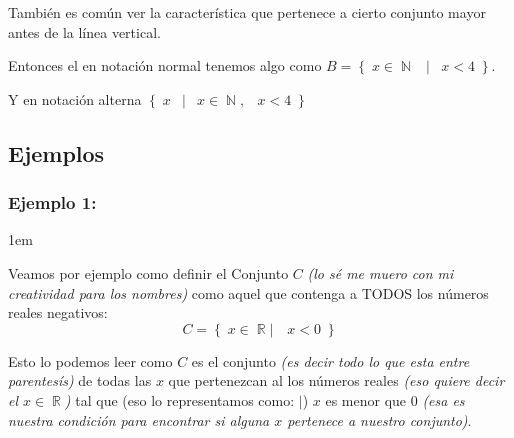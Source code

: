 \documentclass[12pt, fleqn]{report}                             %
\newenvironment{SmallIndentation}[1][0.75em]                    %
        {\begin{adjustwidth}{#1}{}\begin{footnotesize}}             %
        {\end{footnotesize}\end{adjustwidth}}                       %
\DeclareMathOperator \Space     {\quad}                         %
\DeclareMathOperator \MiniSpace {\;}                            %
\newcommand \Such           {\MiniSpace | \MiniSpace}           %
\theoremstyle{break}                                            %
\DeclareMathOperator \Naturals     {\mathbb{N}}                 %
\DeclareMathOperator \Reals        {\mathbb{R}}                 %
\newcommand{\Set}[1]            {\left\{ \; #1 \; \right\}}     %
\begin{document}
                    También es común ver la característica que pertenece a cierto conjunto mayor
                    antes de la línea vertical.

                    Entonces el en notación normal tenemos algo como 
                    $B = \Set{ x \in \Naturals \Such x < 4 }$.

                    Y en notación alterna  $\Set{ x \Such x \in \Naturals, \MiniSpace x < 4}$


                
            \clearpage
            \subsection{Ejemplos} 


                \subsubsection*{Ejemplo 1:}
                    \begin{SmallIndentation}[1em]

                        Veamos por ejemplo como definir el Conjunto $C$ \emph{(lo sé me muero con
                        mi creatividad para los nombres)} como aquel que contenga a TODOS los números
                        reales negativos:
                        \begin{equation*}   
                            C = \Set{ x \in \Reals |\quad x < 0}
                        \end{equation*}

                        Esto lo podemos leer como $C$ es el conjunto \emph{(es decir todo lo que esta
                        entre parentesís)} de todas las $x$ que pertenezcan al los números reales
                        \emph{(eso quiere decir el $x \in \Reals$)} tal que (eso lo representamos
                        como: $|$) $x$ es menor que 0 \emph{(esa es nuestra condición para
                        encontrar si alguna $x$ pertenece a nuestro conjunto)}.

                    \end{SmallIndentation}

\end{document}
